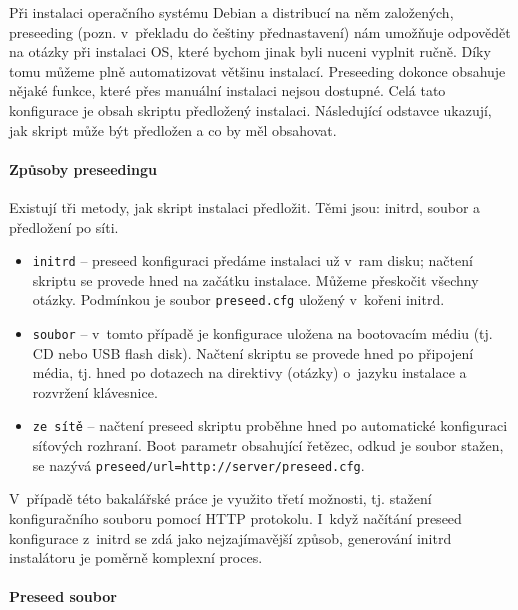Při instalaci operačního systému Debian a distribucí na něm založených, preseeding (pozn. v~překladu do češtiny přednastavení) nám umožňuje odpovědět na otázky při instalaci OS, které bychom jinak byli nuceni vyplnit ručně. Díky tomu můžeme plně automatizovat většinu instalací. Preseeding dokonce obsahuje nějaké funkce, které přes manuální instalaci nejsou dostupné. Celá tato konfigurace je obsah skriptu předložený instalaci. Následující odstavce ukazují, jak skript může být předložen a co by měl obsahovat.

\paragraph{Způsoby preseedingu}

Existují tři metody, jak skript instalaci předložit. Těmi jsou: initrd, soubor a předložení po síti.

\begin{itemize}
\item \texttt{initrd} --  preseed konfiguraci předáme instalaci už v~ram disku; načtení skriptu se provede hned na začátku instalace. Můžeme přeskočit všechny otázky. Podmínkou je soubor \texttt{preseed.cfg} uložený v~kořeni initrd.
\item \texttt{soubor} -- v~tomto případě je konfigurace uložena na bootovacím médiu (tj. CD nebo USB flash disk). Načtení skriptu se provede hned po připojení média, tj. hned po dotazech na direktivy (otázky) o~jazyku instalace a rozvržení klávesnice.
\item \texttt{ze sítě} --  načtení preseed skriptu proběhne hned po automatické konfiguraci síťových rozhraní. Boot parametr obsahující řetězec, odkud je soubor stažen, se nazývá \texttt{preseed/url=http://server/preseed.cfg}.
\end{itemize}


V~případě této bakalářské práce je využito třetí možnosti, tj. stažení konfiguračního souboru pomocí HTTP protokolu. I~když načítání preseed konfigurace z~initrd se zdá jako nejzajímavější způsob, generování initrd instalátoru je poměrně komplexní proces.


\paragraph{Preseed soubor}


